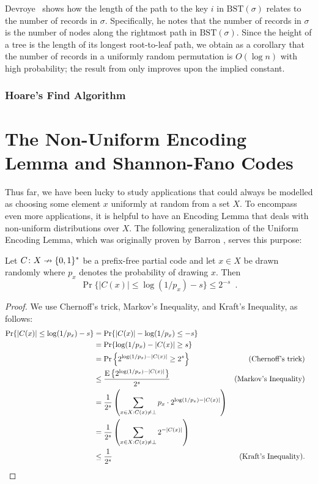 \documentclass{patmorin}
\begin{document}
\begin{rem}
  Devroye~\cite{devroye:records} shows how the length of the path to
  the key $i$ in $\text{BST}(\sigma)$ relates to the number of records
  in $\sigma$. Specifically, he notes that the number of records in
  $\sigma$ is the number of nodes along the rightmost path in
  $\text{BST}(\sigma)$. Since the height of a tree is the length of
  its longest root-to-leaf path, we obtain as a corollary that the
  number of records in a uniformly random permutation is $O(\log n)$
  with high probability; the result from  only
  improves upon the implied constant.
\end{rem}

\subsubsection{Hoare's Find Algorithm}


\section{The Non-Uniform Encoding Lemma and Shannon-Fano Codes}

Thus far, we have been lucky to study applications that could always
be modelled as choosing some element $x$ uniformly at random from a
set $X$. To encompass even more applications, it is helpful to have an
Encoding Lemma that deals with non-uniform distributions over $X$.
The following generalization of the Uniform Encoding Lemma, which was
originally proven by Barron \cite[Theorem~3.1]{barron:dissertation},
serves this purpose:

\begin{lem}  
  Let $C\colon X\nrightarrow\{0,1\}^*$ be a prefix-free partial code and let
  $x\in X$ be drawn randomly where $p_x$ denotes the probability of
  drawing $x$.  Then 
  \[
  \Pr\{ |C(x)| \le \log(1/p_x)-s\} \le 2^{-s} \enspace .
  \]
\end{lem}

\begin{proof}
  We use Chernoff's trick, Markov's Inequality, and Kraft's Inequality,
  as follows: 
  \begin{align*}
    \Pr\{ |C(x)| \le\log(1/p_x)-s \}
    & = \Pr\{|C(x)| -\log(1/p_x) \le -s \} \\
    & = \Pr\{\log(1/p_x)-|C(x)| \ge s \} \\
    & = \Pr\left\{2^{\log(1/p_x)-|C(x)|} \ge 2^s \right\} & \text{(Chernoff's trick)} \\
    & \le \frac{\mathrm{E}\left\{2^{\log(1/p_x)-|C(x)|}\right\}}{2^s} & \text{(Markov's Inequality)} \\
    & = \frac{1}{2^s} \left(\sum_{x\in X : C(x) \neq \bot} p_x\cdot 2^{\log(1/p_x)-|C(x)|}\right) \\
    & = \frac{1}{2^s} \left(\sum_{x\in X : C(x) \neq \bot }2^{-|C(x)|}\right) \\
    & \le \frac{1}{2^s} & \text{(Kraft's Inequality).}  & \qedhere
  \end{align*}
\end{proof}
\end{document}
